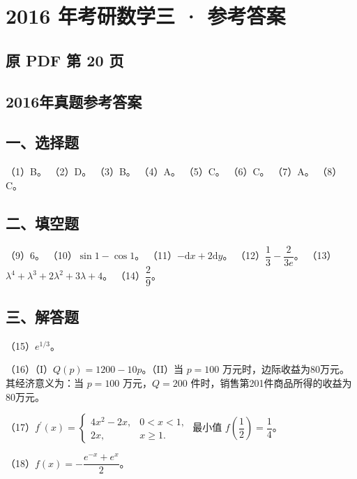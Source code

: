 \documentclass[UTF8,12pt]{ctexart}
\begin{document}
\section*{2016 年考研数学三 · 参考答案}
\subsection*{原 PDF 第 20 页}

\subsection*{2016年真题参考答案}

\subsection*{一、选择题}

（1）B。 （2）D。 （3）B。 （4）A。 （5）C。 （6）C。 （7）A。 （8）C。


\subsection*{二、填空题}

（9）\(\displaystyle 6\)。 （10）\(\displaystyle \sin1-\cos1\)。 （11）\(\displaystyle -\mathrm dx+2\mathrm dy\)。 （12）\(\displaystyle \dfrac{\displaystyle 1}{\displaystyle 3}-\dfrac{\displaystyle 2}{\displaystyle 3e}\)。 （13）\(\displaystyle \lambda^4+\lambda^3+2\lambda^2+3\lambda+4\)。 （14）\(\displaystyle \dfrac{\displaystyle 2}{\displaystyle 9}\)。


\subsection*{三、解答题}

（15）\(\displaystyle e^{1/3}\)。


（16）（I）\(\displaystyle Q(p)=1200-10p\)。（II）当 \(\displaystyle p=100\) 万元时，边际收益为80万元。其经济意义为：当 \(\displaystyle p=100\) 万元，\(\displaystyle Q=200\) 件时，销售第201件商品所得的收益为80万元。


（17）\(\displaystyle f^{\prime}(x)=\begin{cases}4x^2-2x,\allowbreak &0<x<1,\allowbreak \\2x,\allowbreak &x\ge1.\end{cases}\) 最小值 \(\displaystyle f(\dfrac{\displaystyle 1}{\displaystyle 2})=\dfrac{\displaystyle 1}{\displaystyle 4}\)。


（18）\(\displaystyle f(x)=-\dfrac{\displaystyle e^{-x}+e^x}{\displaystyle 2}\)。
\end{document}
